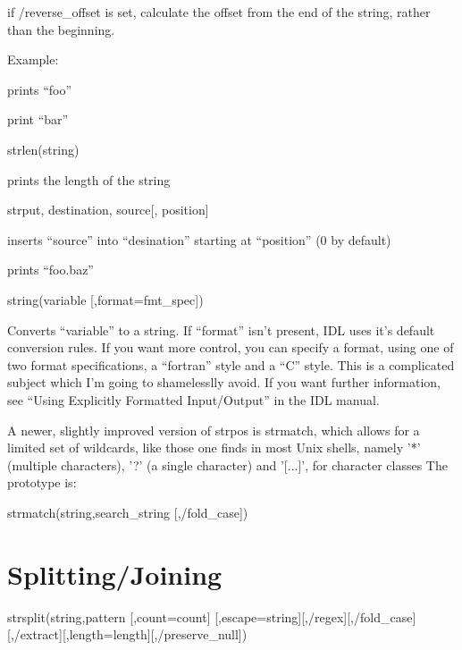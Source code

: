      if /reverse\_offset is set, calculate the offset from the end of
     the string, rather than the beginning.

     Example:


     prints ``foo''


      print ``bar''
     
    
    \item strlen(string)

    prints the length of the string


    \item strput, destination, source[, position]

    inserts ``source'' into ``desination'' starting at ``position'' (0
    by default)

     
     prints ``foo.baz''

    \item string(variable [,format=fmt\_spec])

    Converts ``variable'' to a string. If ``format'' isn't present,
    IDL uses it's default conversion rules. If you want more control,
    you can specify a format, using one of two format specifications,
    a ``fortran'' style and a ``C'' style. This is a complicated
    subject which I'm going to shamelesslly avoid. If you want further
    information, see ``Using Explicitly Formatted Input/Output'' in
    the IDL manual.


\ei

  A newer, slightly improved version of strpos is strmatch, which
  allows for a limited set of wildcards, like those one finds in most
  Unix shells, namely '*' (multiple characters), '?' (a single
  character) and '[...]', for character classes The prototype is:

  strmatch(string,search\_string [,/fold\_case])


\section{Splitting/Joining}%

\bi

  \item strsplit(string,pattern [,count=count]
                [,escape=string][,/regex][,/fold\_case]
                [,/extract][,length=length][,/preserve\_null])

